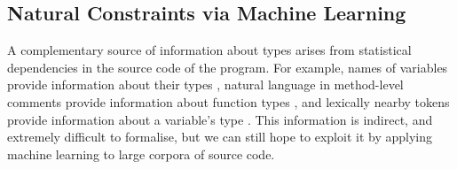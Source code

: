 \documentclass[acmsmall, review, anonymous]{acmart}\settopmatter{printfolios=true,printccs=false,printacmref=false}
\newcommand{\qqpi}[2]{[\![#2]\!]_{#1}}
\begin{document}



\subsection{Natural Constraints via Machine Learning}\label{ssec:natcon}

A complementary source of information about types arises from statistical dependencies
in the source code of the program.  For example, names of variables provide
information about their types \cite{xu16}, natural language in
method-level comments provide information about function types \cite{malik19},
and lexically nearby tokens provide information
about a variable's type \cite{hellendoorn18}.
This information is indirect, and extremely difficult to formalise,
but we can still hope to exploit it by applying machine learning
to large corpora of source code.
\end{document}

